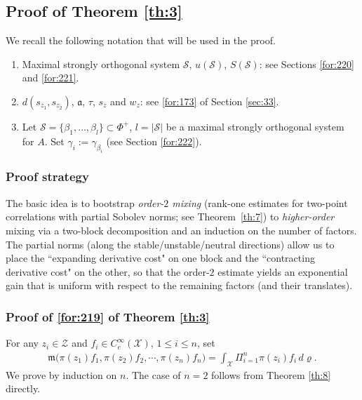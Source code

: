 \documentclass[11 pt]{amsart}
\theoremstyle{definition}
\numberwithin{equation}{section}
\begin{document}
\subsection{Proof of Theorem \ref{th:3}}

We recall  the following notation that will be used in the proof.
\begin{enumerate}
\item Maximal strongly orthogonal system $\mathcal{S}$,  $u(\mathcal{S})$, $S(\mathcal{S})$: see Sections \ref{for:220} and \ref{for:221}.


  \item $d(s_{z_1},s_{z_2})$, $\mathfrak{a}$, $\tau$, $s_z$ and $w_z$: see  \eqref{for:173} of Section \ref{sec:33}.

\item Let $\mathcal S=\{\beta_1,\dots,\beta_l\}\subset\Phi^+$, $l=|\mathcal S|$ be a maximal strongly orthogonal system for $A$. Set $\gamma_i:=\gamma_{\beta_i}$ (see Section \ref{for:222}).

\end{enumerate}

\subsubsection{Proof strategy} The basic idea is to bootstrap \emph{order-$2$ mixing} (rank-one estimates for two-point
correlations with partial Sobolev norms; see Theorem~\ref{th:7}) to \emph{higher-order}
mixing via a two-block decomposition and an induction on the number of factors.  The
partial norms (along the stable/unstable/neutral directions) allow us to place the
``expanding derivative cost" on one block and the ``contracting derivative cost" on
the other, so that the order-$2$ estimate yields an exponential gain that is uniform
with respect to the remaining factors (and their translates).


\subsubsection{Proof of \eqref{for:219} of Theorem \ref{th:3}}\label{sec:27}




 For any $z_i\in \mathcal{Z}$ and $f_i\in C_c^\infty(\mathcal{X})$, $1\leq i\leq n$, set
\begin{align*}
  \mathfrak{m}\big(\pi(z_1)f_1,\pi(z_2)f_2,\cdots,\pi(z_n)f_n \big)=\int_{\mathcal{X}} \Pi_{i=1}^{n} \pi(z_i)f_i \,d\varrho.
\end{align*}
We prove by induction on $n$. The case of $n=2$ follows from Theorem \ref{th:8} directly.
\end{document}
